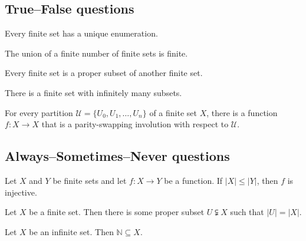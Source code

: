 \subsection*{True--False questions}


\begin{chapex} %
\label{cqCombinatoricsTFBegin}
Every finite set has a unique enumeration.
\end{chapex}

\begin{chapex} %
The union of a finite number of finite sets is finite.
\end{chapex}

\begin{chapex} %
Every finite set is a proper subset of another finite set.
\end{chapex}

\begin{chapex} %
There is a finite set with infinitely many subsets.
\end{chapex}

\begin{chapex} %
\label{cqCombinatoricsTFEnd}
For every partition $\mathcal{U} = \{ U_0, U_1, \dots, U_n \}$ of a finite set $X$, there is a function $f : X \to X$ that is a parity-swapping involution with respect to $\mathcal{U}$.
\end{chapex}

\subsection*{Always--Sometimes--Never questions}


\begin{chapex} %
\label{cqCombinatoricsASNBegin}
Let $X$ and $Y$ be finite sets and let $f : X \to Y$ be a function. If $|X| \le |Y|$, then $f$ is injective.
\end{chapex}

\begin{chapex} %
Let $X$ be a finite set. Then there is some proper subset $U \subsetneqq X$ such that $|U| = |X|$.
\end{chapex}

\begin{chapex} %
Let $X$ be an infinite set. Then $\mathbb{N} \subseteq X$.
\end{chapex}

